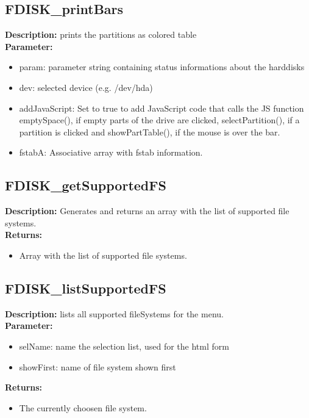 \subsection{FDISK\_printBars}
\textbf{Description:} prints the partitions as colored table\\
\textbf{Parameter:}
\begin{itemize}
\item param: parameter string containing status informations about the harddisks
\item dev: selected device (e.g. /dev/hda)
\item addJavaScript: Set to true to add JavaScript code that calls the JS function emptySpace(), if empty parts of the drive are clicked, selectPartition(), if a partition is clicked and showPartTable(), if the mouse is over the bar.
\item fstabA: Associative array with fstab information.
\end{itemize}

\subsection{FDISK\_getSupportedFS}
\textbf{Description:} Generates and returns an array with the list of supported file systems.\\
\textbf{Returns:}
\begin{itemize}
\item Array with the list of supported file systems.
\end{itemize}

\subsection{FDISK\_listSupportedFS}
\textbf{Description:} lists all supported fileSystems for the menu.\\
\textbf{Parameter:}
\begin{itemize}
\item selName: name the selection list, used for the html form
\item showFirst: name of file system shown first
\end{itemize}
\textbf{Returns:}
\begin{itemize}
\item The currently choosen file system.
\end{itemize}

